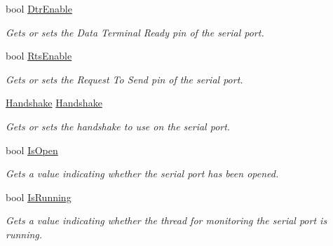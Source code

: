 \begin{DoxyCompactItemize}
bool \mbox{\hyperlink{class_r_j_c_p_1_1_i_o_1_1_ports_1_1_native_1_1_unix_native_serial_aee4bb1ce2aa98414dc4c52ef849943e3}{Dtr\+Enable}}
\begin{DoxyCompactList}\small\item\em Gets or sets the Data Terminal Ready pin of the serial port. \end{DoxyCompactList}\item 
bool \mbox{\hyperlink{class_r_j_c_p_1_1_i_o_1_1_ports_1_1_native_1_1_unix_native_serial_a1db47fbc4884e599f35475a4ea840e03}{Rts\+Enable}}
\begin{DoxyCompactList}\small\item\em Gets or sets the Request To Send pin of the serial port. \end{DoxyCompactList}\item 
\mbox{\hyperlink{namespace_r_j_c_p_1_1_i_o_1_1_ports_a5328e888558ed5726b3fb7b8b692527c}{Handshake}} \mbox{\hyperlink{class_r_j_c_p_1_1_i_o_1_1_ports_1_1_native_1_1_unix_native_serial_a27e292f45b69d1a8ca363c625d6baed5}{Handshake}}
\begin{DoxyCompactList}\small\item\em Gets or sets the handshake to use on the serial port. \end{DoxyCompactList}\item 
bool \mbox{\hyperlink{class_r_j_c_p_1_1_i_o_1_1_ports_1_1_native_1_1_unix_native_serial_a1ad7c5fb46d22ac194b1f0f63c4e67bf}{Is\+Open}}
\begin{DoxyCompactList}\small\item\em Gets a value indicating whether the serial port has been opened. \end{DoxyCompactList}\item 
bool \mbox{\hyperlink{class_r_j_c_p_1_1_i_o_1_1_ports_1_1_native_1_1_unix_native_serial_a56702f32ecf25b9bcee00da36a4c2504}{Is\+Running}}
\begin{DoxyCompactList}\small\item\em Gets a value indicating whether the thread for monitoring the serial port is running. \end{DoxyCompactList}\end{DoxyCompactItemize}
